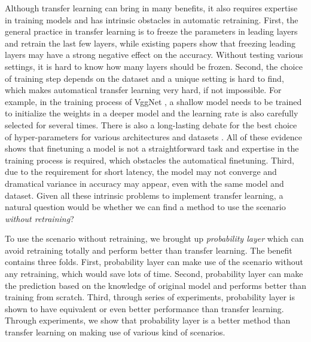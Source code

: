 \documentclass{article}
\begin{document}
Although transfer learning can bring in many benefits, it also requires expertise in training models and has intrinsic obstacles in automatic retraining. First, the general practice in transfer learning is to freeze the parameters in leading layers and retrain the last few layers, while existing papers \cite{yosinski2014transferable} show that freezing leading layers may have a strong negative effect on the accuracy. Without testing various settings, it is hard to know how many layers should be frozen. Second, the choice of training step depends on the dataset and a unique setting is hard to find, which makes automatical transfer learning very hard, if not impossible. For example, in the training process of VggNet \cite{simonyan2014very}, a shallow model needs to be trained to initialize the weights in a deeper model and the learning rate is also carefully selected for several times. There is also a long-lasting debate for the best choice of hyper-parameters for various architectures and datasets \cite{bergstra2012random,  glorot2010understanding, he2015delving, smith2017don, wilson2003general}. All of these evidence shows that finetuning a model is not a straightforward task and expertise in the training process is required, which obstacles the automatical finetuning. Third, due to the requirement for short latency, the model may not converge and dramatical variance in accuracy may appear, even with the same model and dataset. Given all these intrinsic problems to implement transfer learning, a natural question would be whether we can find a method to use the scenario \textit{without retraining}? 

To use the scenario without retraining, we brought up \textit{probability layer} which can avoid retraining totally and perform better than transfer learning. The benefit contains three folds. First, probability layer can make use of the scenario without any retraining, which would save lots of time. Second, probability layer can make the prediction based on the knowledge of original model and performs better than training from scratch. Third, through series of experiments, probability layer is shown to have equivalent or even better performance than transfer learning. Through experiments, we show that probability layer is a better method than transfer learning on making use of various kind of scenarios. 
\end{document}
